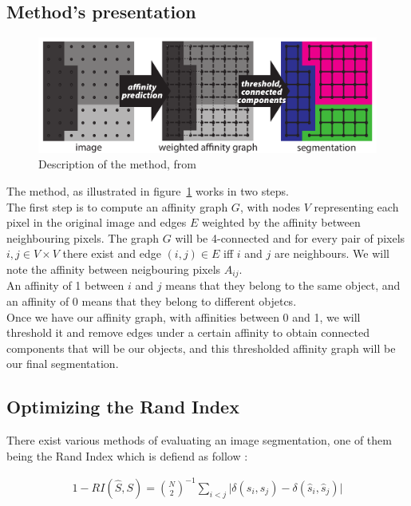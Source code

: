 \subsection{Method's presentation}

\begin{figure}[!htbp]
	\centering
	\includegraphics[width=0.8\linewidth]{./images/malis_method.png}
	\caption{Description of the method, from~\cite{turaga_maximin_2009}}%
	\label{fig:malis_method}
\end{figure}

The method, as illustrated in figure~\ref{fig:malis_method} works in two steps.\\
The first step is to compute an affinity graph $G$, with nodes $V$ representing
each pixel in the original image and edges $E$ weighted by the affinity between
neighbouring pixels. The graph $G$ will be 4-connected and for every pair of
pixels $i, j \in V\times V$ there exist and edge $(i,j)\in E$ iff $i$ and $j$ are
neighbours. We will note the affinity between neigbouring pixels $A_{ij}$.\\
An affinity of 1 between $i$ and $j$ means that they belong to the same object,
and an affinity of 0 means that they belong to different objetcs.\\

Once we have our affinity graph, with affinities between 0 and 1, we will
threshold it and remove edges under a certain affinity to obtain connected
components that will be our objects, and this thresholded affinity graph will
be our final segmentation.\\


\subsection{Optimizing the Rand Index}

There exist various methods of evaluating an image segmentation, one of them
being the Rand Index which is defiend as follow :

\begin{gather*}
	1 - RI(\hat{S},S) = \binom{N}{2}^{-1} \sum_{i<j} \lvert \delta(s_i,s_j) -
	\delta(\hat{s}_i,\hat{s}_j) \rvert
\end{gather*}

